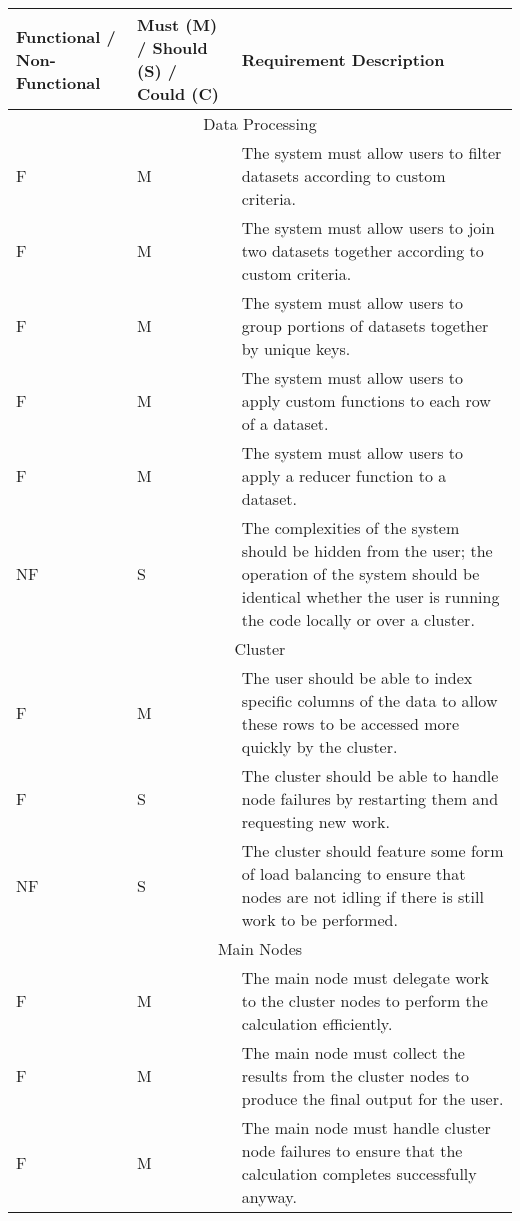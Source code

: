 \documentclass[12pt]{article}
\begin{document}
	\maketitle
		
	\begin{longtable}{ |p{}|p{}|p{}|} 
		\hline
	 	Functional / Non-Functional & Must (M) / Should (S) / Could (C) & Requirement Description \\ \hline
		\multicolumn{3}{|c|}{Data Processing} \\ \hline
		F & M & The system must allow users to filter datasets according to custom criteria. \\ \hline
		F & M & The system must allow users to join two datasets together according to custom criteria. \\ \hline
		F & M & The system must allow users to group portions of datasets together by unique keys. \\ \hline
		F & M & The system must allow users to apply custom functions to each row of a dataset. \\ \hline
		F & M & The system must allow users to apply a reducer function to a dataset. \\ \hline 
		NF & S & The complexities of the system should be hidden from the user; the operation of the system should be identical whether the user is running the code locally or over a cluster. \\ \hline
		\multicolumn{3}{|c|}{Cluster} \\ \hline
		F & M & The user should be able to index specific columns of the data to allow these rows to be accessed more quickly by the cluster. \\ \hline
		F & S & The cluster should be able to handle node failures by restarting them and requesting new work. \\ \hline
		NF & S & The cluster should feature some form of load balancing to ensure that nodes are not idling if there is still work to be performed. \\ \hline
		\multicolumn{3}{|c|}{Main Nodes} \\ \hline
		F & M & The main node must delegate work to the cluster nodes to perform the calculation efficiently. \\ \hline
		F & M & The main node must collect the results from the cluster nodes to produce the final output for the user. \\ \hline
		F & M & The main node must handle cluster node failures to ensure that the calculation completes successfully anyway. \\ \hline

\end{longtable}
\end{document}
